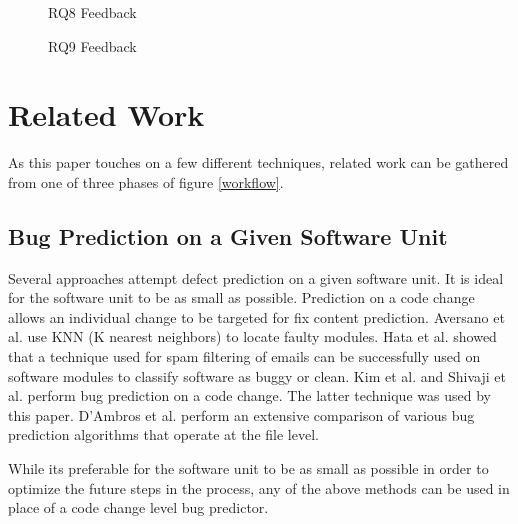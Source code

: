 \documentclass[10pt, conference, letterpaper, compsocconf]{IEEEtran}
\begin{document}
\begin{figure}
	\caption{RQ8 Feedback}
	\label{Suggester_RQ1_Results}
\end{figure}

\begin{figure}
	\caption{RQ9 Feedback}
	\label{Suggester_RQ2_Results}
\end{figure}

\section{Related Work}
\label{RelatedWork}

\par As this paper touches on a few different techniques, related work can be gathered from one of three phases of figure \ref{workflow}. 


\subsection{Bug Prediction on a Given Software Unit} 
\par Several approaches attempt defect prediction on a given software unit. It is ideal for the software unit to be as small as possible. Prediction on a code change allows an individual change to be targeted for fix content prediction. Aversano et al. \cite{aversano2007lbi} use KNN (K nearest neighbors) to locate faulty modules.  Hata et al. \cite{Hata2008} showed that a technique used for spam filtering of emails can be successfully used on software modules to classify software as buggy or clean. Kim et al. \cite{Kim2007p58} and Shivaji et al. \cite{shivaji2009reducing} perform bug prediction on a code change. The latter technique was used by this paper. D'Ambros et al. \cite{d2011evaluating} perform an extensive comparison of various bug prediction algorithms that operate at the file level.

\par While its preferable for the software unit to be as small as possible in order to optimize the future steps in the process, any of the above methods can be used in place of a code change level bug predictor.
\end{document}
